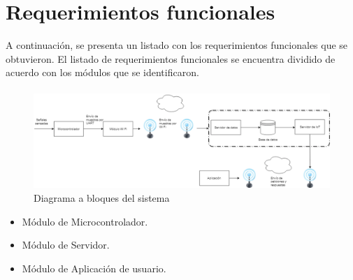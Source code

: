 \section{Requerimientos funcionales}
A continuación, se presenta un listado con los requerimientos funcionales que se obtuvieron.
El listado de requerimientos funcionales se encuentra dividido de acuerdo con los módulos que se identificaron.

\paragraph{}
\begin{figure}[H]
	\centering
	\includegraphics[scale=.3]{Capitulo3/img/diagramaBloques.png}
	\caption{Diagrama a bloques del sistema}
	\label{fig:diagrama_dispMonitoreo}
\end{figure}

\begin{itemize}
	\item Módulo de Microcontrolador.
	\item Módulo de Servidor.
	\item Módulo de Aplicación de usuario.
\end{itemize}

